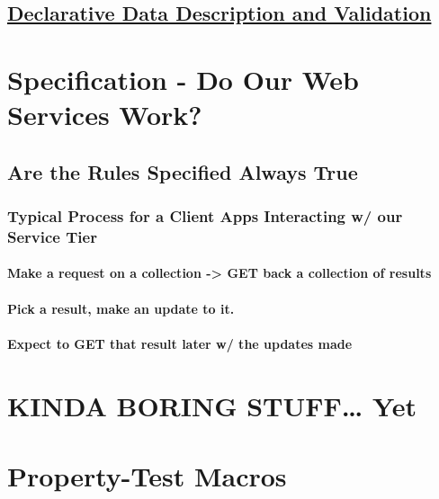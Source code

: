 \documentclass[11pt]{article}
\begin{document}
\subsection{\href{https://github.com/Prismatic/schema}{Declarative Data Description and Validation}}
\label{sec-28-2}
\section{Specification - Do Our Web Services Work?}
\label{sec-29}

\subsection{Are the Rules Specified \textbf{Always} True}
\label{sec-29-1}
\subsubsection{Typical Process for a Client Apps Interacting w/ our Service Tier}
\label{sec-29-1-1}
\paragraph{Make a request on a collection -> GET back a collection of results}
\label{sec-29-1-1-1}
\paragraph{Pick a result, make an update to it.}
\label{sec-29-1-1-2}
\paragraph{Expect to GET that result later w/ the updates made}
\label{sec-29-1-1-3}
\section{KINDA BORING STUFF\ldots{} Yet}
\label{sec-30}
\section{Property-Test Macros}
\label{sec-31}
\end{document}
